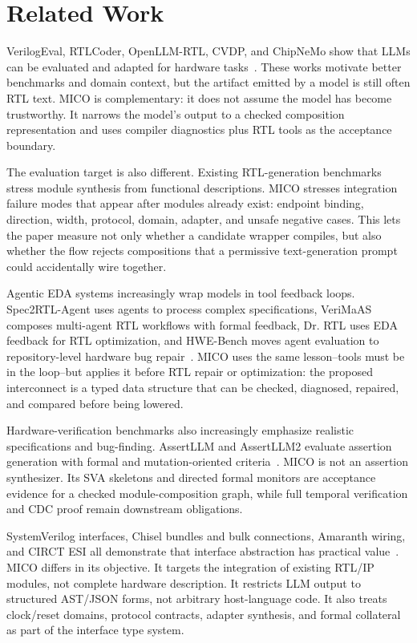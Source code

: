 \section{Related Work}

VerilogEval, RTLCoder, OpenLLM-RTL, CVDP, and ChipNeMo show that LLMs can be evaluated and adapted for hardware tasks~\cite{verilogeval2023,rtlcoder2023,openllmrtl2025,cvdp2025,chipnemo2023}. These works motivate better benchmarks and domain context, but the artifact emitted by a model is still often RTL text. MICO is complementary: it does not assume the model has become trustworthy. It narrows the model's output to a checked composition representation and uses compiler diagnostics plus RTL tools as the acceptance boundary.

The evaluation target is also different. Existing RTL-generation benchmarks
stress module synthesis from functional descriptions. MICO stresses integration
failure modes that appear after modules already exist: endpoint binding,
direction, width, protocol, domain, adapter, and unsafe negative cases. This
lets the paper measure not only whether a candidate wrapper compiles, but also
whether the flow rejects compositions that a permissive text-generation prompt
could accidentally wire together.

Agentic EDA systems increasingly wrap models in tool feedback loops.
Spec2RTL-Agent uses agents to process complex specifications, VeriMaAS composes
multi-agent RTL workflows with formal feedback, Dr. RTL uses EDA feedback for
RTL optimization, and HWE-Bench moves agent evaluation to repository-level
hardware bug repair~\cite{spec2rtlagent2025,verimaas2025,drrtl2026,hwebench2026}.
MICO uses the same lesson--tools must be in the loop--but applies it before RTL
repair or optimization: the proposed interconnect is a typed data structure that
can be checked, diagnosed, repaired, and compared before being lowered.

Hardware-verification benchmarks also increasingly emphasize realistic
specifications and bug-finding. AssertLLM and AssertLLM2 evaluate assertion
generation with formal and mutation-oriented criteria~\cite{assertllm2024,assertllm2_2026}.
MICO is not an assertion synthesizer. Its SVA skeletons and directed formal
monitors are acceptance evidence for a checked module-composition graph, while
full temporal verification and CDC proof remain downstream obligations.

SystemVerilog interfaces, Chisel bundles and bulk connections, Amaranth wiring, and CIRCT ESI all demonstrate that interface abstraction has practical value~\cite{chisel_interfaces,amaranth_wiring,circt_esi}. MICO differs in its objective. It targets the integration of existing RTL/IP modules, not complete hardware description. It restricts LLM output to structured AST/JSON forms, not arbitrary host-language code. It also treats clock/reset domains, protocol contracts, adapter synthesis, and formal collateral as part of the interface type system.

